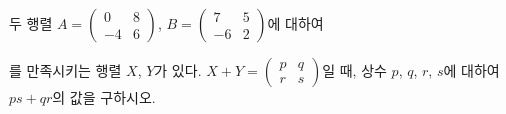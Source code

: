 두 행렬 $A=\begin{pmatrix} 0 & 8 \\ -4 & 6 \end{pmatrix}$, $B=\begin{pmatrix} 7 & 5 \\ -6 & 2 \end{pmatrix}$에 대하여\par\smallskip{}\par\smallskip\noindent 를 만족시키는 행렬 $X$, $Y$가 있다. $X+Y=\begin{pmatrix} p & q \\ r & s \end{pmatrix}$일 때, 상수 $p$, $q$, $r$, $s$에 대하여 $ps+qr$의 값을 구하시오.
